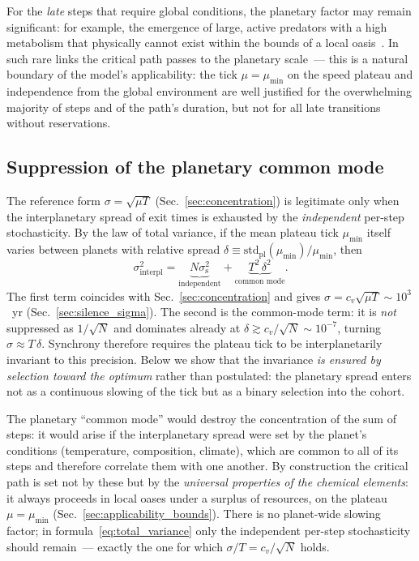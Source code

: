 \documentclass[11pt,a4paper]{article}
\begin{document}
For the \emph{late} steps that require global conditions, the planetary factor may remain significant: for example, the emergence of large, active predators with a high metabolism that physically cannot exist within the bounds of a local oasis~\cite{Knoll2014}. In such rare links the critical path passes to the planetary scale~--- this is a natural boundary of the model's applicability: the tick $\mu = \mu_{\min}$ on the speed plateau and independence from the global environment are well justified for the overwhelming majority of steps and of the path's duration, but not for all late transitions without reservations.

\subsection{Suppression of the planetary common mode}
\label{sec:planetary_spread}

The reference form $\sigma = \sqrt{\mu T}$ (Sec.~\ref{sec:concentration}) is legitimate only when the interplanetary spread of exit times is exhausted by the \emph{independent} per-step stochasticity. By the law of total variance, if the mean plateau tick $\mu_{\min}$ itself varies between planets with relative spread $\delta \equiv \mathrm{std}_{\mathrm{pl}}(\mu_{\min})/\mu_{\min}$, then
\begin{equation}
\sigma^2_{\mathrm{interpl}}
  = \underbrace{N\sigma_{\mathrm{s}}^2}_{\text{independent}}
  + \underbrace{T^2\,\delta^2}_{\text{common mode}}.
\label{eq:total_variance}
\end{equation}
The first term coincides with Sec.~\ref{sec:concentration} and gives $\sigma = c_v\sqrt{\mu T}\sim10^3$~yr (Sec.~\ref{sec:silence_sigma}). The second is the common-mode term: it is \emph{not} suppressed as $1/\sqrt{N}$ and dominates already at $\delta \gtrsim c_v/\sqrt{N}\sim10^{-7}$, turning $\sigma \approx T\,\delta$. Synchrony therefore requires the plateau tick to be interplanetarily invariant to this precision. Below we show that the invariance \emph{is ensured by selection toward the optimum} rather than postulated: the planetary spread enters not as a continuous slowing of the tick but as a binary selection into the cohort.

The planetary ``common mode'' would destroy the concentration of the sum of steps: it would arise if the interplanetary spread were set by the planet's conditions (temperature, composition, climate), which are common to all of its steps and therefore correlate them with one another. By construction the critical path is set not by these but by the \emph{universal properties of the chemical elements}: it always proceeds in local oases under a surplus of resources, on the plateau $\mu = \mu_{\min}$ (Sec.~\ref{sec:applicability_bounds}). There is no planet-wide slowing factor; in formula~\eqref{eq:total_variance} only the independent per-step stochasticity should remain~--- exactly the one for which $\sigma/T = c_v/\sqrt{N}$ holds.
\end{document}
